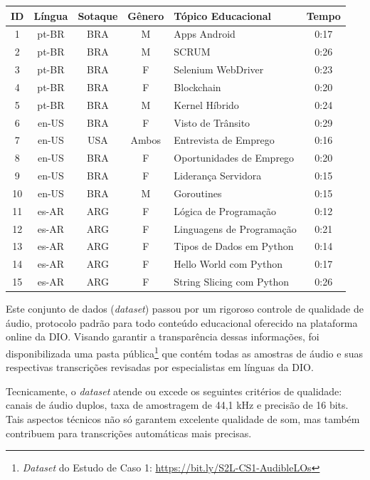 \begin{quadro}[htb]
\centering
\caption{\textit{Dataset} do Estudo de Caso 1 (Áudios Extraídos das Videoaulas)}
\label{quadro:c4:poc-audios-summary}
\begin{tabular}{c|c|c|c|l|c}
\hline
\textbf{ID} & \textbf{Língua} & \textbf{Sotaque} & \textbf{Gênero} & \textbf{Tópico Educacional} & \textbf{Tempo} \\ \hline
1 & pt-BR & BRA & M & Apps Android & 0:17 \\ \hline
2 & pt-BR & BRA & M & SCRUM & 0:26 \\ \hline
3 & pt-BR & BRA & F & Selenium WebDriver & 0:23 \\ \hline
4 & pt-BR & BRA & F & Blockchain & 0:20 \\ \hline
5 & pt-BR & BRA & M & Kernel Híbrido & 0:24 \\ \hline
6 & en-US & BRA & F & Visto de Trânsito & 0:29 \\ \hline
7 & en-US & USA & Ambos & Entrevista de Emprego & 0:16 \\  \hline
8 & en-US & BRA & F & Oportunidades de Emprego & 0:20 \\  \hline
9 & en-US & BRA & F & Liderança Servidora & 0:15 \\  \hline
10 & en-US & BRA & M & Goroutines & 0:15 \\  \hline
11 & es-AR & ARG & F & Lógica de Programação & 0:12 \\  \hline
12 & es-AR & ARG & F & Linguagens de Programação & 0:21 \\  \hline
13 & es-AR & ARG & F & Tipos de Dados em Python & 0:14 \\  \hline
14 & es-AR & ARG & F & Hello World com Python & 0:17 \\  \hline
15 & es-AR & ARG & F & String Slicing com Python & 0:26 \\ \hline
\end{tabular}
\end{quadro}

Este conjunto de dados (\textit{dataset}) passou por um rigoroso controle de qualidade de áudio, protocolo padrão para todo conteúdo educacional oferecido na plataforma online da DIO. Visando garantir a transparência dessas informações, foi disponibilizada uma pasta pública\footnote{\textit{Dataset} do Estudo de Caso 1: \url{https://bit.ly/S2L-CS1-AudibleLOs}} que contém todas as amostras de áudio e suas respectivas transcrições revisadas por especialistas em línguas da DIO. 

Tecnicamente, o \textit{dataset} atende ou excede os seguintes critérios de qualidade: canais de áudio duplos, taxa de amostragem de 44,1 kHz e precisão de 16 bits. Tais aspectos técnicos não só garantem excelente qualidade de som, mas também contribuem para transcrições automáticas mais precisas.

